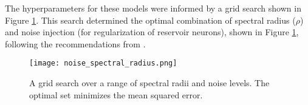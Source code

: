 The hyperparameters for these models were informed by a grid search shown in
Figure \ref{fig:gridsearch}. This search determined the optimal combination of
spectral radius ($\rho$) and noise injection (for regularization of reservoir
neurons), shown in Figure \ref{fig:gridsearch}, following the recommendations
from \cite{lukosevicius_practical_2012}.

\begin{figure}[h]
  \centering
  \texttt{[image: noise\_spectral\_radius.png]}
  \caption{A grid search over a range of spectral radii and noise levels. The
  optimal set minimizes the mean squared error.}
  \label{fig:gridsearch}
\end{figure}

